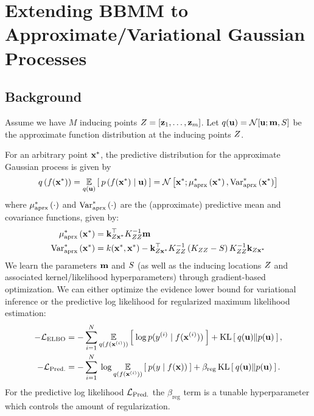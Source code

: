 \chapter{Extending BBMM to Approximate/Variational Gaussian Processes}
\label{chapter:variational}

\section{Background}

Assume we have $M$ inducing points $Z = [\mathbf{z}_1, \ldots, \mathbf{z}_m]$.
Let $q(\bu) = \normaldist{\bu; \bm}{\bS}$ be the approximate function distribution at the inducing points $Z$.

For an arbitrary point $\mathbf{x}^*$, the predictive distribution for the approximate Gaussian process is given by
%
\begin{equation}
  q \left( f(\bxtest) \right) = \Evover{q(\bu)}{ \: p\left( f(\bxtest) \mid \bu \right) \: }
  = \normaldist{ \bxtest; \ameantest{ \bxtest }} { \avartest{ \bxtest }}
  \label{eqn:approx_pred}
\end{equation}
%
where $\mu^*_\text{aprx} \left( \cdot \right)$ and $\text{Var}^*_\text{aprx} \left( \cdot \right)$ are the (approximate) predictive mean and covariance functions, given by:
%
\begin{align}
  \mu^*_\text{aprx} \left( \mathbf{x}^* \right) &= \mathbf{k}_{Z\mathbf{x}^*}^\top K_{ZZ}^{-1} \mathbf{m}
  \label{eqn:approx_pred_mean} \\
  \text{Var}^*_\text{aprx} \left( \mathbf{x}^* \right) &= k(\mathbf{x}^*, \mathbf{x}^*) -
    \mathbf{k}_{Z\mathbf{x}^*}^\top K_{ZZ}^{-1} \left( K_{ZZ} - S \right) K_{ZZ}^{-1} \mathbf{k}_{Z\mathbf{x}^*}
  \label{eqn:approx_pred_covar}
\end{align}
%
We learn the parameters $\mathbf{m}$ and $S$ (as well as the inducing locations $Z$ and associated kernel/likelihood hyperparameters) through gradient-based optimization.
We can either optimize the evidence lower bound \cite{hensman2015scalable} for variational inference or the predictive log likelihood \cite{jankowiak2020parametric} for regularized maximum likelihood estimation:
%
\begin{align}
	-\mathcal L_\text{ELBO} &= -\sum_{i=1}^N \operatorname*{\mathbb{E}}_{q(f(\mathbf{x}^{(i)}))} \left[   \: \log p( y^{(i)} \mid f(\mathbf{x}^{(i)}) ) \:  \right] + \operatorname*{KL} \left[ \:  q(\mathbf{u})  \Vert  p(\mathbf{u})  \: \right],
	\label{eqn:elbo}
	\\
	-\mathcal L_\text{Pred.} &= -\sum_{i=1}^N \: \log \operatorname*{\mathbb{E}}_{q(f(\mathbf{x}^{(i)}))} \left[   \: p( y \mid f(\mathbf{x}) ) \:  \right] + \beta_\text{reg} \operatorname*{KL} \left[ \:  q(\mathbf{u})  \Vert  p(\mathbf{u})  \: \right].
	\label{eqn:predll}
\end{align}
%
For the predictive log likelihood $\mathcal L_\text{Pred.}$ the $\beta_\text{reg}$ term is a tunable hyperparameter which controls the amount of regularization.



